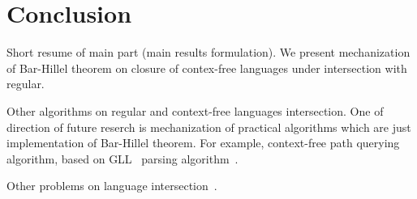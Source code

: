 \section{Conclusion}

Short resume of main part (main results formulation).
We present mechanization of Bar-Hillel theorem on closure of contex-free languages under intersection with regular.

Other algorithms on regular and context-free languages intersection.
One of direction of future reserch is mechanization of practical algorithms which are just implementation of Bar-Hillel theorem.
For example, context-free path querying algorithm, based on GLL~\cite{scott2010gll} parsing algorithm~\cite{grigorev2016context}.

Other problems on language intersection~\cite{nederhof2002parsing, nederhof2004language}.

